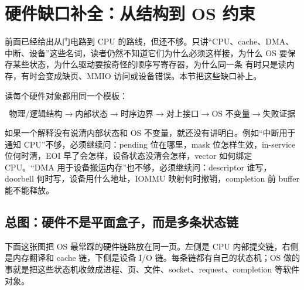\section{硬件缺口补全：从结构到 OS 约束}

前面已经给出从门电路到 CPU 的路线，但还不够。只讲“CPU、cache、DMA、中断、设备”这些名词，读者仍然不知道它们为什么必须这样接，为什么 OS 要保存某些状态，为什么驱动要按奇怪的顺序写寄存器，为什么同一条  有时只是读内存，有时会变成缺页、MMIO 访问或设备错误。本节把这些缺口补上。

读每个硬件对象都用同一个模板：

\[
\text{物理/逻辑结构}
\rightarrow
\text{内部状态}
\rightarrow
\text{时序边界}
\rightarrow
\text{对上接口}
\rightarrow
\text{OS 不变量}
\rightarrow
\text{失败证据}
\]

如果一个解释没有说清内部状态和 OS 不变量，就还没有讲明白。例如“中断用于通知 CPU”不够，必须继续问：pending 位在哪里，mask 位怎样生效，in-service 位何时清，EOI 早了会怎样，设备状态没清会怎样，vector 如何绑定 CPU。“DMA 用于设备搬运内存”也不够，必须继续问：descriptor 谁写，doorbell 何时写，设备用什么地址，IOMMU 映射何时撤销，completion 前 buffer 能不能释放。

\subsection{总图：硬件不是平面盒子，而是多条状态链}

下面这张图把 OS 最常踩的硬件链路放在同一页。左侧是 CPU 内部提交链，右侧是内存翻译和 cache 链，下侧是设备 I/O 链。每条链都有自己的状态机；OS 做的事就是把这些状态机收敛成进程、页、文件、socket、request、completion 等软件对象。


